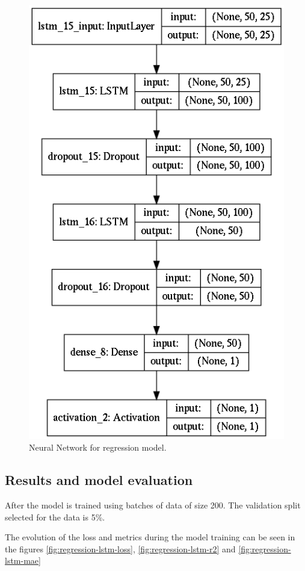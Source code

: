 \begin{figure}
\centering
\includegraphics{Figures/regression-lstm-model}
\decoRule
\caption[Neural Network for regression model]{Neural Network for regression model.}
\label{fig:regression-lstm-model}
\end{figure}

\subsection{Results and model evaluation}

After the model is trained using batches of data of size 200. The validation split selected for the data is 5\%.

The evolution of the loss and metrics during the model training can be seen in the figures \ref{fig:regression-lstm-loss}, \ref{fig:regression-lstm-r2} and \ref{fig:regression-lstm-mae}

